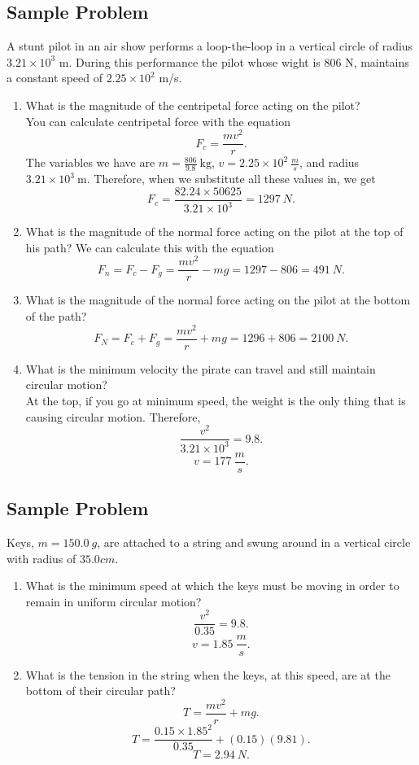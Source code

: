 \documentclass[a4paper]{report}
\begin{document}
    \subsection{Sample Problem}
    A stunt pilot in an air show performs a loop-the-loop in a vertical circle of radius $3.21 \times 10^3$ m. During this performance the pilot whose wight is 806 N, maintains a constant speed of $2.25 \times 10^2$ m/s. 
    \begin{enumerate}
        \item What is the magnitude of the centripetal force acting on the pilot? \\
        You can calculate centripetal force with the equation
        \[
        F_c = \frac{mv^2}{r}
        .\] 
        The variables we have are $m = \frac{806}{9.8}\ \text{kg}$, $v = 2.25 \times 10^2\ \frac{m}{s}$, and radius $3.21 \times 10^3\ \text{m}$. Therefore, when we substitute all these values in, we get 
        \[
            F_c = \frac{82.24 \times 50625}{3.21 \times 10^3} = 1297\ N
        .\] 
        \item What is the magnitude of the normal force acting on the pilot at the top of his path? 
        We can calculate this with the equation
        \[
        F_n = F_c - F_g = \frac{mv^2}{r} - mg = 1297 - 806 = 491\ N
        .\] 
        \item What is the magnitude of the normal force acting on the pilot at the bottom of the path?
            \[
            F_N = F_c + F_g = \frac{mv^2}{r} + mg = 1296 + 806 = 2100\ N
            .\] 
        \item What is the minimum velocity the pirate can travel and still maintain circular motion? \\
        At the top, if you go at minimum speed, the weight is the only thing that is causing circular motion. Therefore,
        \[
        \frac{v^2}{3.21\times 10^3} = 9.8
        .\] 
        \[
        v = 177\ \frac{m}{s}
        .\] 
    \end{enumerate}
    \subsection{Sample Problem}
    Keys, $m = 150.0\ g$, are attached to a string and swung around in a vertical circle with radius of $35.0 cm$.
    \begin{enumerate}
        \item What is the minimum speed at which the keys must be moving in order to remain in uniform circular motion? \\
        \[
        \frac{v^2}{0.35} = 9.8
        .\] 
        \[
        v = 1.85\ \frac{m}{s}
        .\] 
        \item What is the tension in the string when the keys, at this speed, are at the bottom of their circular path? \\
        \[
        T = \frac{mv^2}{r} + mg
        .\] 
        \[
            T = \frac{0.15 \times 1.85^2}{0.35} + (0.15)(9.81)
        .\] 
        \[
        T = 2.94\ N
        .\] 
    \end{enumerate}
\end{document}
